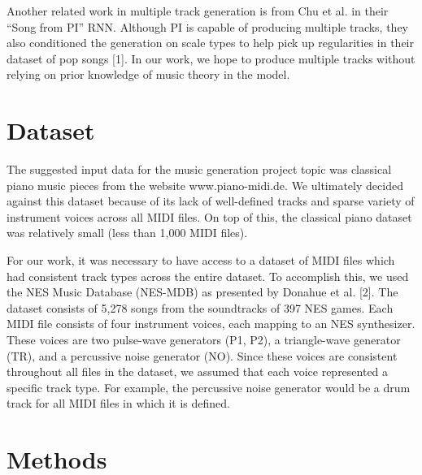 \documentclass{article}
\begin{document}
Another related work in multiple track generation is from Chu et al. in their “Song from PI” RNN. Although PI is capable of producing multiple tracks, they also conditioned the generation on scale types to help pick up regularities in their dataset of pop songs [1]. In our work, we hope to produce multiple tracks without relying on prior knowledge of music theory in the model.


\section{Dataset}

The suggested input data for the music generation project topic was classical piano music pieces from the website www.piano-midi.de. We ultimately decided against this dataset because of its lack of well-defined tracks and sparse variety of instrument voices across all MIDI files. On top of this, the classical piano dataset was relatively small (less than 1,000 MIDI files).


For our work, it was necessary to have access to a dataset of MIDI files which had consistent track types across the entire dataset. To accomplish this, we used the NES Music Database (NES-MDB) as presented by Donahue et al. [2]. The dataset consists of 5,278 songs from the soundtracks of 397 NES games. Each MIDI file consists of four instrument voices, each mapping to an NES synthesizer. These voices are two pulse-wave generators (P1, P2), a triangle-wave generator (TR), and a percussive noise generator (NO). Since these voices are consistent throughout all files in the dataset, we assumed that each voice represented a specific track type. For example, the percussive noise generator would be a drum track for all MIDI files in which it is defined.



\section{Methods}

\end{document}
